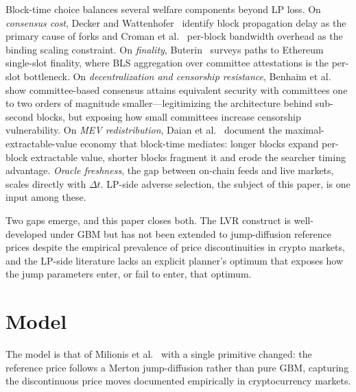 \documentclass[runningheads]{llncs}
\newcommand{\dt}{\Delta t}
\newcommand{\1}{\mathbf{1}}
\begin{document}
Block-time choice balances several welfare components beyond LP loss. On \emph{consensus cost}, Decker and Wattenhofer~\cite{decker2013information} identify block propagation delay as the primary cause of forks and Croman et al.~\cite{croman2016scaling} per-block bandwidth overhead as the binding scaling constraint. On \emph{finality}, Buterin~\cite{buterin2022paths} surveys paths to Ethereum single-slot finality, where BLS aggregation over committee attestations is the per-slot bottleneck. On \emph{decentralization and censorship resistance}, Benhaim et al.~\cite{benhaim2024scaling} show committee-based consensus attains equivalent security with committees one to two orders of magnitude smaller---legitimizing the architecture behind sub-second blocks, but exposing how small committees increase censorship vulnerability. On \emph{MEV redistribution}, Daian et al.~\cite{daian2020flash} document the maximal-extractable-value economy that block-time mediates: longer blocks expand per-block extractable value, shorter blocks fragment it and erode the searcher timing advantage. \emph{Oracle freshness}, the gap between on-chain feeds and live markets, scales directly with $\dt$. LP-side adverse selection, the subject of this paper, is one input among these.

Two gaps emerge, and this paper closes both. The LVR construct is well-developed under GBM but has not been extended to jump-diffusion reference prices despite the empirical prevalence of price discontinuities in crypto markets, and the LP-side literature lacks an explicit planner's optimum that exposes how the jump parameters enter, or fail to enter, that optimum.

\section{Model}\label{sec:model}

The model is that of Milionis et al.~\cite{milionis2022automated,milionis2023automated} with a single primitive changed: the reference price follows a Merton jump-diffusion rather than pure GBM, capturing the discontinuous price moves documented empirically in cryptocurrency markets.
\end{document}
